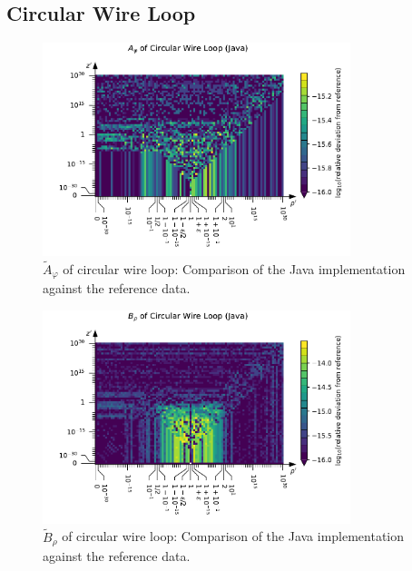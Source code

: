 \subsection{Circular Wire Loop}
\begin{figure}[htbp]
 \centering
 \includegraphics[width=0.8\textwidth]{img/CircularWireLoop_A_phi_Java.pdf}
 \caption{$\tilde{A}_\varphi$ of circular wire loop: Comparison of the Java implementation against the reference data.}
 \label{fig:CircularWireLoop_A_phi_Java}
\end{figure}
\begin{figure}[htbp]
 \centering
 \includegraphics[width=0.8\textwidth]{img/CircularWireLoop_B_rho_Java.pdf}
 \caption{$\tilde{B}_\rho$ of circular wire loop: Comparison of the Java implementation against the reference data.}
 \label{fig:CircularWireLoop_B_rho_Java}
\end{figure}
